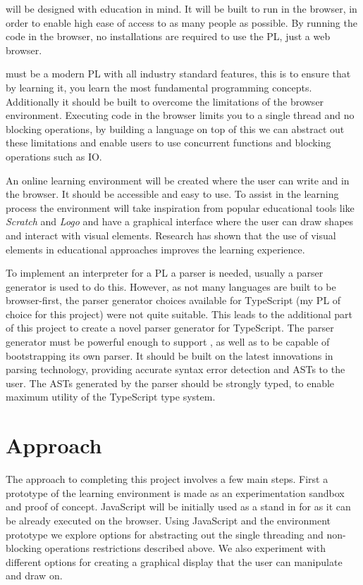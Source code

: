 \Setanta{} will be designed with education in mind. It will be built to run in the browser, in order to enable high ease of access to as many people as possible. By running the code in the browser, no installations are required to use the PL, just a web browser.

\Setanta{} must be a modern PL with all industry standard features, this is to ensure that by learning it, you learn the most fundamental programming concepts. Additionally it should be built to overcome the limitations of the browser environment. Executing code in the browser limits you to a single thread and no blocking operations, by building a language on top of this we can abstract out these limitations and enable users to use concurrent functions and blocking operations such as IO.

An online learning environment will be created where the user can write and \Setanta{} in the browser. It should be accessible and easy to use. To assist in the learning process the environment will take inspiration from popular educational tools like \emph{Scratch} and \emph{Logo} and have a graphical interface where the user can draw shapes and interact with visual elements. Research has shown that the use of visual elements in educational approaches improves the learning experience\cite{graphiclearning}.

To implement an interpreter for a PL a parser is needed, usually a parser generator is used to do this. However, as not many languages are built to be browser-first, the parser generator choices available for TypeScript (my PL of choice for this project) were not quite suitable. This leads to the additional part of this project to create a novel parser generator for TypeScript. The parser generator must be powerful enough to support \Setanta{}, as well as to be capable of bootstrapping its own parser. It should be built on the latest innovations in parsing technology, providing accurate syntax error detection and ASTs to the user. The ASTs generated by the parser should be strongly typed, to enable maximum utility of the TypeScript type system.

\section{Approach}
The approach to completing this project involves a few main steps. First a prototype of the learning environment is made as an experimentation sandbox and proof of concept. JavaScript will be initially used as a stand in for \Setanta{} as it can be already executed on the browser. Using JavaScript and the environment prototype we explore options for abstracting out the single threading and non-blocking operations restrictions described above. We also experiment with different options for creating a graphical display that the user can manipulate and draw on.

